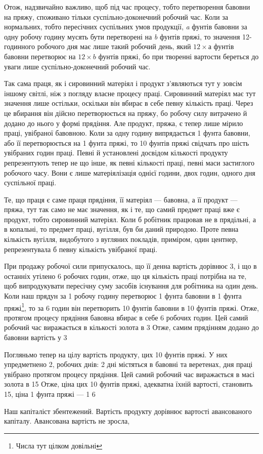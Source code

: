 
Отож, надзвичайно важливо, щоб під час процесу, тобто перетворення
бавовни на пряжу, споживано тільки суспільно-доконечний
робочий час. Коли за нормальних, тобто пересічних
суспільних умов продукції, \emph{a} фунтів бавовни за одну робочу
годину мусять бути перетворені на \emph{b} фунтів пряжі, то значення
12-годинного робочого дня має лише такий робочий день, який
$12 × а$ фунтів бавовни перетворює на $12 × b$ фунтів пряжі, бо
при творенні вартости береться до уваги лише суспільно-доконечний
робочий час.

Так сама праця, як і сировинний матеріял і продукт з’являються
тут у зовсім іншому світлі, ніж з погляду власне процесу
праці. Сировинний матеріял має тут значення лише остільки,
оскільки він вбирає в себе певну кількість праці. Через це вбирання
він дійсно перетворюється на пряжу, бо робочу силу витрачено
й додано до нього у формі прядіння. Але продукт, пряжа,
є тепер лише мірило праці, увібраної бавовною. Коли за одну
годину випрядається 1 фунта бавовни, або її перетворюється на
1 фунта пряжі, то 10 фунтів пряжі свідчать про шість увібраних
годин праці. Певні й установлені досвідом кількості продукту
репрезентують тепер не що інше, як певні кількості праці, певні
маси застиглого робочого часу. Вони є лише матеріялізація однієї
години, двох годин, одного дня суспільної праці.

Те, що праця є саме праця прядіння, її матеріял — бавовна,
а її продукт — пряжа, тут так само не має значення, як і те, що
самий предмет праці вже є продукт, тобто сировинний матеріял.
Коли б робітник працював не в прядільні, а в копальні, то предмет
праці, вугілля, був би даний природою. Проте певна кількість
вугілля, видобутого з вугляних покладів, приміром, один
центнер, репрезентувала б певну кількість увібраної праці.

При продажу робочої сили припускалось, що її денна вартість
дорівнює 3, і що в останніх утілено 6 робочих годин,
отже, що ця кількість праці потрібна на те, щоб випродукувати
пересічну суму засобів існування для робітника на один день.
Коли наш прядун за 1 робочу годину перетворює 1 фунта
бавовни в 1 фунта пряжі\footnote{Числа тут цілком довільні}, то за 6 годин він перетворить
10 фунтів бавовни в 10 фунтів пряжі. Отже, протягом процесу
прядіння бавовна вбирає в себе 6 робочих годин. Цей самий робочий
час виражається в кількості золота в 3 Отже, самим
прядінням додано до бавовни вартість у 3

Погляньмо тепер на цілу вартість продукту, цих 10 фунтів
пряжі. У них упредметнено 2, робочих днів: 2 дні містяться в
бавовні та веретенах,  дня праці увібрано протягом процесу прядіння.
Цей самий робочий час виражається в масі золота в 15
Отже, ціна цих 10 фунтів пряжі, адекватна їхній вартості,
становить 15, ціна 1 фунта пряжі — 1 6

Наш капіталіст збентежений. Вартість продукту дорівнює
вартості авансованого капіталу. Авансована вартість не зросла,
\parbreak{}  %
